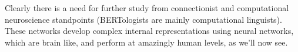 Clearly there is a need for further study from connectionist and computational neuroscience standpoints (BERTologists are mainly computational linguists).  These networks develop complex internal representations using neural networks, which are brain like, and perform at amazingly human levels, as we'll now see.


